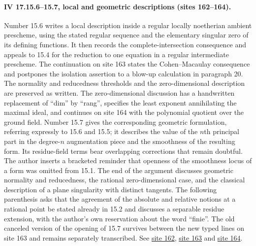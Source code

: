 \documentclass[10pt,a4paper]{article}
\begin{document}
\paragraph{IV 17.15.6--15.7, local and geometric descriptions (sites 162--164).}
Number 15.6 writes a local description inside a regular locally noetherian ambient prescheme, using the stated regular sequence and the elementary singular zero of its defining functions. It then records the complete-intersection consequence and appeals to 15.4 for the reduction to one equation in a regular intermediate prescheme. The continuation on site 163 states the Cohen--Macaulay consequence and postpones the isolation assertion to a blow-up calculation in paragraph 20. The normality and reducedness thresholds and the zero-dimensional description are preserved as written. The zero-dimensional discussion has a handwritten replacement of ``dim'' by ``rang'', specifies the least exponent annihilating the maximal ideal, and continues on site 164 with the polynomial quotient over the ground field. Number 15.7 gives the corresponding geometric formulation, referring expressly to 15.6 and 15.5; it describes the value of the $n$th principal part in the degree-$n$ augmentation piece and the smoothness of the resulting form. Its residue-field terms bear overlapping corrections that remain doubtful. The author inserts a bracketed reminder that openness of the smoothness locus of a form was omitted from 15.1. The end of the argument discusses geometric normality and reducedness, the rational zero-dimensional case, and the classical description of a plane singularity with distinct tangents. The following parenthesis asks that the agreement of the absolute and relative notions at a rational point be stated already in 15.2 and discusses a separable residue extension, with the author's own reservation about the word ``finie''. The old canceled version of the opening of 15.7 survives between the new typed lines on site 163 and remains separately transcribed. See \href{https://grothendieck.umontpellier.fr/web/viewer.html?file=../25.pdf#page=163}{site 162}, \href{https://grothendieck.umontpellier.fr/web/viewer.html?file=../25.pdf#page=164}{site 163} and \href{https://grothendieck.umontpellier.fr/web/viewer.html?file=../25.pdf#page=165}{site 164}.
\end{document}
